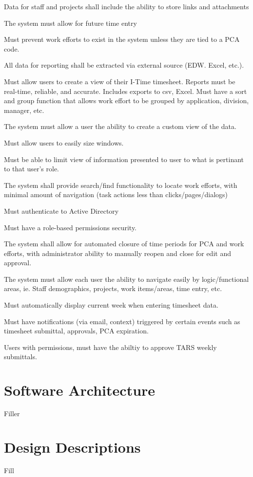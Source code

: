 \documentclass[letterpaper]{article}
\begin{document}
Data for staff and projects shall include the ability to store links and attachments

The system must allow for future time entry

Must prevent work efforts to exist in the system unless they are tied to a PCA code.

All data for reporting shall be extracted via external source (EDW. Excel, etc.).

Must allow users to create a view of their I-Time timesheet. 
Reports must be real-time, reliable, and accurate. Includes exports to csv, Excel. 
Must have a sort and group function that allows work effort to be grouped by application, division, manager, etc.

The system must allow a user the ability to create a custom view of the data.

Must allow users to easily size windows.

Must be able to limit view of information presented to user to what is pertinant to that user's role.

The system shall provide search/find functionality to locate work efforts, with minimal amount of navigation (task actions less than clicks/pages/dialogs)

Must authenticate to Active Directory

Must have a role-based permissions security.

The system shall allow for automated closure of time periods for PCA and work efforts, with administrator ability to manually reopen and close for edit and approval.

The system must allow each user the ability to navigate easily by logic/functional areas, ie. Staff demographics, projects, work items/areas, time entry, etc.

Must automatically display current week when entering timesheet data.

Must have notifications (via email, context) triggered by certain events such as timesheet submittal, approvals, PCA expiration. 

Users with permissions, must have the abiltiy to approve TARS weekly submittals.

\section{Software Architecture} 
Filler
\section{Design Descriptions}
Fill
\end{document}

